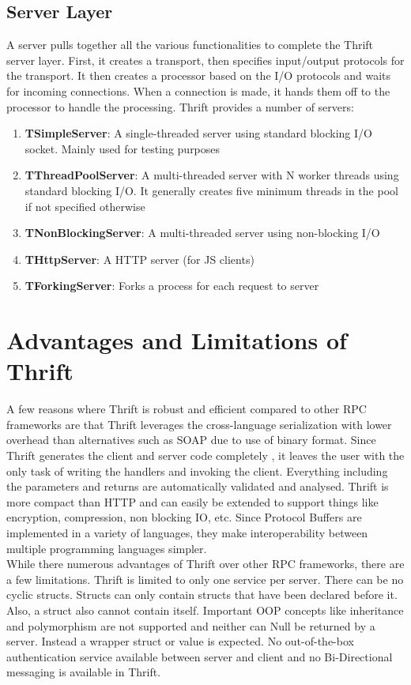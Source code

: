 \documentclass[9pt,twocolumn,twoside]{../../styles/osajnl}
\begin{document}
\subsection{Server Layer}	
A server pulls together all the various functionalities to complete the Thrift server layer. First, it creates a transport, then specifies input/output protocols for the transport. It then creates a processor based on the I/O protocols and waits for incoming connections. When a connection is made, it hands them off to the processor to handle the processing. Thrift provides a number of servers:
\begin{enumerate}
	\item \textbf{TSimpleServer}: A single-threaded server using standard blocking I/O socket. Mainly used for testing purposes
	\item \textbf{TThreadPoolServer}: A multi-threaded server with N worker threads using standard blocking I/O. It generally creates five minimum threads in the pool if not specified otherwise
	\item \textbf{TNonBlockingServer}: A multi-threaded server using non-blocking I/O
	\item \textbf{THttpServer}: A HTTP server (for JS clients)
	\item \textbf{TForkingServer}: Forks a process for each request to server
\end{enumerate}

\section{Advantages and Limitations of Thrift}
A few reasons where Thrift is robust and efficient compared to other RPC frameworks are that Thrift leverages the cross-language serialization with lower overhead than alternatives such as SOAP due to use of binary format. Since Thrift generates the client and server code completely \cite{www-thrift-tutorial}, it leaves the user with the only task of writing the handlers and invoking the client. Everything including the parameters and returns are automatically validated and analysed. Thrift is more compact than HTTP and can easily be extended to support things like encryption, compression, non blocking IO, etc. Since Protocol Buffers \cite{www-protocol-buffers} are implemented in a variety of languages, they make interoperability between multiple programming languages simpler.\\

While there numerous advantages of Thrift over other RPC frameworks, there are a few limitations. Thrift \cite{pdf-thrift-tutorial} is limited to only one service per server. There can be no cyclic structs. Structs can only contain structs that have been declared before it. Also, a struct also cannot contain itself. Important OOP concepts like inheritance and polymorphism are not supported and neither can Null be returned by a server. Instead a wrapper struct or value is expected. No out-of-the-box authentication service available between server and client and no Bi-Directional messaging is available in Thrift.\\
\end{document}
